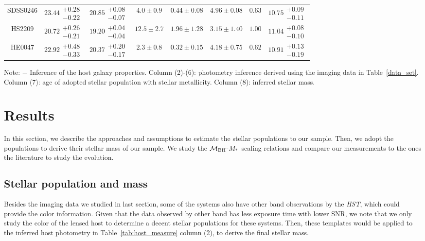 \documentclass[fleqn,usenatbib]{mnras}
\newcommand{\hst}{{\it HST}}
\newcommand{\mbh}{$\mathcal M_{\rm BH}$}
\newcommand{\mstar}{{$M_*$}}
\begin{document}
\begin{table}
\begin{threeparttable}
\begin{tabular}{cccccccc}
SDSS0246 & $23.44\substack{+0.28\\-0.22}$ & $20.85\substack{+0.08\\-0.07}$ & $4.0\pm0.9$ & $0.44\pm0.08$ & $4.96\pm0.08$ & $0.63$ & $10.75\substack{+0.09\\-0.11}$ \\
HS2209 & $20.72\substack{+0.26\\-0.21}$ & $19.20\substack{+0.04\\-0.04}$ & $12.5\pm2.7$ & $1.96\pm1.28$ & $3.15\pm1.40$ & $1.00$ & $11.04\substack{+0.08\\-0.10}$ \\
HE0047 & $22.92\substack{+0.48\\-0.33}$ & $20.37\substack{+0.20\\-0.17}$ & $2.3\pm0.8$ & $0.32\pm0.15$ & $4.18\pm0.75$ & $0.62$ & $10.91\substack{+0.13\\-0.19}$ \\
\hline
\end{tabular}
\begin{tablenotes}
      \small
      \item Note: $-$ Inference of the host galaxy properties. Column (2)-(6): photometry inference derived using the imaging data in Table~\ref{data_set}. Column (7): age of adopted stellar population with stellar metallicity. Column (8): inferred stellar mass. 
\end{tablenotes}    
\end{threeparttable}
\end{table}


\section{Results}\label{sec:result}
In this section, we describe the approaches and assumptions to estimate the stellar populations to our sample. Then, we adopt the populations to derive their stellar mass of our sample. We study the \mbh-\mstar\ scaling relations and compare our measurements to the ones the literature to study the evolution.

\subsection{Stellar population and mass}\label{sec:mstar}
Besides the imaging data we studied in last section, some of the systems also have other band observations by the \hst, which could provide the color information. Given that the data observed by other band has less exposure time with lower SNR, we note that we only study the color of the lensed host to determine a decent stellar populations for these systems. Then, these templates would be applied to the inferred host photometry in Table~\ref{tab:host_measure} column (2), to derive the final stellar mass.
\end{document}
